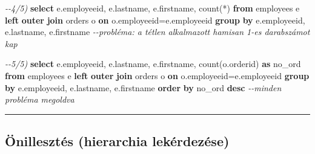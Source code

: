 \documentclass[
  magyar,
]{article}
\newenvironment{Shaded}{}{}
\newcommand{\CommentTok}[1]{\textcolor[rgb]{0.38,0.63,0.69}{\textit{#1}}}
\newcommand{\FunctionTok}[1]{\textcolor[rgb]{0.02,0.16,0.49}{#1}}
\newcommand{\KeywordTok}[1]{\textcolor[rgb]{0.00,0.44,0.13}{\textbf{#1}}}
\newcommand{\NormalTok}[1]{#1}
\newcommand{\OperatorTok}[1]{\textcolor[rgb]{0.40,0.40,0.40}{#1}}
\begin{document}
\begin{Shaded}
\begin{Highlighting}[]
\CommentTok{{-}{-}4/5)}
\KeywordTok{select}\NormalTok{ e.employeeid, e.lastname, e.firstname, }\FunctionTok{count}\NormalTok{(}\OperatorTok{*}\NormalTok{)}
\KeywordTok{from}\NormalTok{ employees e }\KeywordTok{left} \KeywordTok{outer} \KeywordTok{join}\NormalTok{ orders o }\KeywordTok{on}\NormalTok{ o.employeeid}\OperatorTok{=}\NormalTok{e.employeeid}
\KeywordTok{group} \KeywordTok{by}\NormalTok{ e.employeeid, e.lastname, e.firstname}
\CommentTok{{-}{-}probléma: a tétlen alkalmazott hamisan 1{-}es darabszámot kap}

\CommentTok{{-}{-}5/5)}
\KeywordTok{select}\NormalTok{ e.employeeid, e.lastname, e.firstname, }\FunctionTok{count}\NormalTok{(o.orderid) }\KeywordTok{as}\NormalTok{ no\_ord}
\KeywordTok{from}\NormalTok{ employees e }\KeywordTok{left} \KeywordTok{outer} \KeywordTok{join}\NormalTok{ orders o }\KeywordTok{on}\NormalTok{ o.employeeid}\OperatorTok{=}\NormalTok{e.employeeid}
\KeywordTok{group} \KeywordTok{by}\NormalTok{ e.employeeid, e.lastname, e.firstname}
\KeywordTok{order} \KeywordTok{by}\NormalTok{ no\_ord }\KeywordTok{desc}
\CommentTok{{-}{-}minden probléma megoldva}
\end{Highlighting}
\end{Shaded}

\begin{center}\rule{0.5\linewidth}{0.5pt}\end{center}

\subsection{Önillesztés (hierarchia
lekérdezése)}\label{uxf6nillesztuxe9s-hierarchia-lekuxe9rdezuxe9se}
\end{document}
